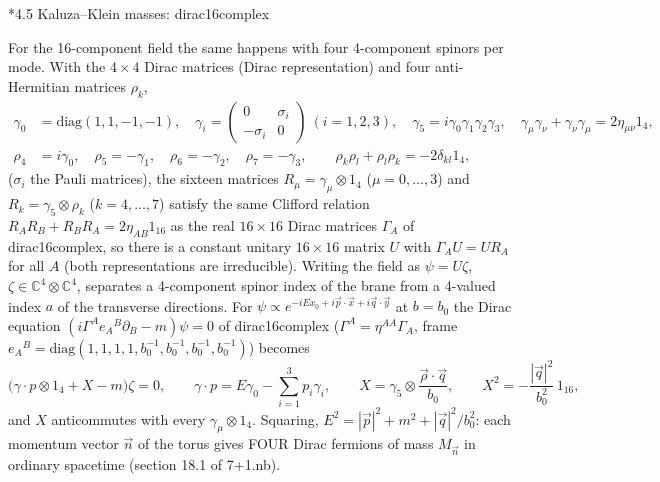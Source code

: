 \documentclass[10pt,a4paper]{article}
\makeatletter
\renewcommand\subsection{\@startsection{subsection}{2}{\z@}{-3.25ex\@plus -1ex \@minus -.2ex}{1.5ex \@plus .2ex}{\normalfont\large\bfseries\raggedright}}
\makeatother
\begin{document}
\subsection*{4.5 Kaluza–Klein masses: dirac16complex}
For the 16-component field the same happens with four 4-component spinors per mode. With the $4\times4$ Dirac matrices (Dirac representation) and four anti-Hermitian matrices $\rho_k$,
\begin{align*}
\gamma_0&=\mathrm{diag}(1,1,-1,-1),\quad \gamma_i=\begin{pmatrix}0&\sigma_i\\-\sigma_i&0\end{pmatrix}\ (i=1,2,3),\quad \gamma_5=i\gamma_0\gamma_1\gamma_2\gamma_3,\quad \gamma_\mu\gamma_\nu+\gamma_\nu\gamma_\mu=2\eta_{\mu\nu}1_4, \\
\rho_4&=i\gamma_0,\quad \rho_5=-\gamma_1,\quad \rho_6=-\gamma_2,\quad \rho_7=-\gamma_3,\qquad \rho_k\rho_l+\rho_l\rho_k=-2\delta_{kl}1_4,
\end{align*}
($\sigma_i$ the Pauli matrices), the sixteen matrices $R_\mu=\gamma_\mu\otimes1_4$ ($\mu=0,\dots,3$) and $R_k=\gamma_5\otimes\rho_k$ ($k=4,\dots,7$) satisfy the same Clifford relation $R_AR_B+R_BR_A=2\eta_{AB}1_{16}$ as the real $16\times16$ Dirac matrices $\Gamma_A$ of dirac16complex, so there is a constant unitary $16\times16$ matrix $U$ with $\Gamma_AU=UR_A$ for all $A$ (both representations are irreducible). Writing the field as $\psi=U\zeta$, $\zeta\in\mathbb C^4\otimes\mathbb C^4$, separates a 4-component spinor index of the brane from a 4-valued index $a$ of the transverse directions. For $\psi\propto e^{-iEx_0+i\vec p\cdot\vec x+i\vec q\cdot\vec y}$ at $b=b_0$ the Dirac equation $(i\Gamma^Ae_A{}^B\partial_B-m)\psi=0$ of dirac16complex ($\Gamma^A=\eta^{AA}\Gamma_A$, frame $e_A{}^B=\mathrm{diag}(1,1,1,1,b_0^{-1},b_0^{-1},b_0^{-1},b_0^{-1})$) becomes
\begin{equation*}
\big(\gamma\cdot p\otimes1_4+X-m\big)\zeta=0,\qquad \gamma\cdot p=E\gamma_0-\sum_{i=1}^3p_i\gamma_i,\qquad X=\gamma_5\otimes\frac{\vec\rho\cdot\vec q}{b_0},\qquad X^2=-\frac{|\vec q|^2}{b_0^2}\,1_{16},
\end{equation*}
and $X$ anticommutes with every $\gamma_\mu\otimes1_4$. Squaring, $E^2=|\vec p|^2+m^2+|\vec q|^2/b_0^2$: each momentum vector $\vec n$ of the torus gives FOUR Dirac fermions of mass $M_{\vec n}$ in ordinary spacetime (section 18.1 of 7+1.nb).
\end{document}
